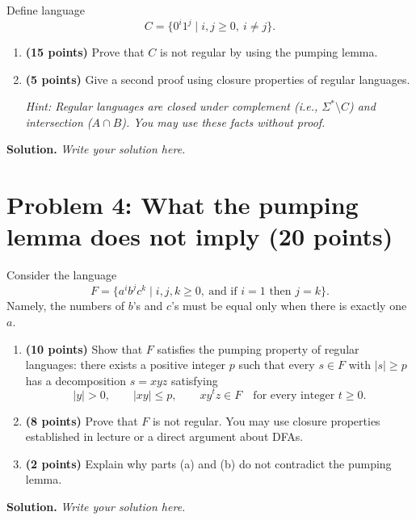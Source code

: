 \documentclass[11pt,a4paper]{article}
\begin{document}
Define language
\[
    C=\{0^i1^j \mid i,j\geq 0,\ i\neq j\}.
\]
\begin{enumerate}
    \item[(a)] \textbf{(15 points)}
    Prove that $C$ is not regular by using the pumping lemma.

    \item[(b)] \textbf{(5 points)}
    Give a second proof using closure properties of regular languages.
    
    \textit{Hint: Regular languages are closed under \emph{complement (i.e., $\Sigma^* \setminus C$)} and
    \emph{intersection ($A \cap B$)}. You may use these facts without proof.} 
\end{enumerate}

\textbf{Solution.} \textit{Write your solution here.}

\vspace{5em}

\section*{Problem 4: What the pumping lemma does not imply (20 points)}

Consider the language
\[
    F=\{a^i b^j c^k \mid i,j,k\geq 0,\ \text{and if } i=1 \text{ then } j=k \}.
\]
Namely, the numbers of $b$'s and $c$'s must be equal only when there is exactly one $a$.

\begin{enumerate}
    \item[(a)] \textbf{(10 points)}
    Show that $F$ satisfies the pumping property of regular languages:
    there exists a positive integer $p$ such that every $s \in F$ with $|s| \geq p$ has a decomposition $s=xyz$ satisfying
    \[
        |y|>0, \qquad |xy| \leq p, \qquad xy^t z \in F \quad \text{for every integer } t\geq 0.
    \]

    \item[(b)] \textbf{(8 points)} Prove that $F$ is not regular.
    You may use closure properties established in lecture or a direct argument about DFAs. 

    \item[(c)] \textbf{(2 points)} Explain why parts (a) and (b) do not contradict the pumping lemma.
\end{enumerate}

\textbf{Solution.} \textit{Write your solution here.}

\vspace{5em} 
\end{document}

